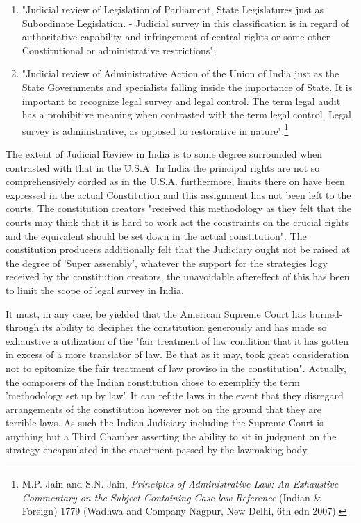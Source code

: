 \begin{multicols}{2}
\begin{enumerate}[label=\roman*)]
\item "Judicial review of Legislation of Parliament, State Legislatures just as Subordinate
Legislation. - Judicial survey in this classification is in regard of authoritative capability and
infringement of central rights or some other Constitutional or administrative restrictions"; 

\item "Judicial review of Administrative Action of the Union of India just as the State
Governments and specialists falling inside the importance of State. It is important to
recognize legal survey and legal control. The term legal audit has a prohibitive meaning when
contrasted with the term legal control. Legal survey is administrative, as opposed to
restorative in nature".\footnote{M.P. Jain and S.N. Jain, \textit{Principles of Administrative Law: An Exhaustive Commentary on the Subject  Containing Case-law Reference} (Indian \& Foreign) 1779 (Wadhwa and Company Nagpur, New Delhi, 6th  edn 2007).}
\end{enumerate}

\vspace{-.3cm}


\vspace{-.1cm}

\noi
The extent of Judicial Review in India is to some degree surrounded when contrasted with
that in the U.S.A. In India the principal rights are not so comprehensively corded as in the
U.S.A. furthermore, limits there on have been expressed in the actual Constitution and this
assignment has not been left to the courts. The constitution creators "received this
methodology as they felt that the courts may think that it is hard to work act the constraints
on the crucial rights and the equivalent should be set down in the actual constitution". The
constitution producers additionally felt that the Judiciary ought not be raised at the degree of
'Super assembly', whatever the support for the strategies logy received by the constitution
creators, the unavoidable aftereffect of this has been to limit the scope of legal survey in
India.

\vspace{-.1cm}

\noi
It must, in any case, be yielded that the American Supreme Court has burned-through its
ability to decipher the constitution generously and has made so exhaustive a utilization of the
"fair treatment of law condition that it has gotten in excess of a more translator of law. Be
that as it may, took great consideration not to epitomize the fair treatment of law proviso in
the constitution". Actually, the composers of the Indian constitution chose to exemplify the
term 'methodology set up by law'. It can refute laws in the event that they disregard arrangements of the constitution however not on the ground that they are terrible laws. As
such the Indian Judiciary including the Supreme Court is anything but a Third Chamber
asserting the ability to sit in judgment on the strategy encapsulated in the enactment passed
by the lawmaking body.


\end{multicols}
